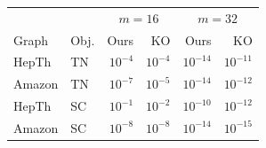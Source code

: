 \begin{tabular}{llrrrr}
\toprule
& & \multicolumn{2}{c}{$m=16$} & \multicolumn{2}{c}{$m=32$} \\
Graph & Obj. & Ours & KO & Ours & KO \\
\midrule
HepTh & TN & $10^{-4}$ & $10^{-4}$ & $10^{-14}$ & $10^{-11}$ \\
Amazon & TN & $10^{-7}$ & $10^{-5}$ & $10^{-14}$ & $10^{-12}$ \\
HepTh & SC & $10^{-1}$ & $10^{-2}$ & $10^{-10}$ & $10^{-12}$ \\
Amazon & SC & $10^{-8}$ & $10^{-8}$ & $10^{-14}$ & $10^{-15}$ \\
\bottomrule
\end{tabular}
